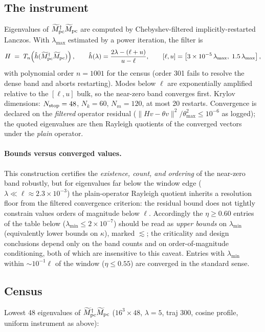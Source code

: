 \documentclass[11pt]{article}
\newcommand{\Mt}{\widetilde{M}}
\begin{document}
\subsection{The instrument}
\label{sec:instrument}
Eigenvalues of $\Mt_{\rm pc}^\dagger\Mt_{\rm pc}$ are computed by
Chebyshev-filtered implicitly-restarted Lanczos.  With
$\lambda_{\max}$ estimated by a power iteration, the filter is
\begin{equation}
H \;=\; T_{n}\!\left(\hat h(\Mt_{\rm pc}^\dagger\Mt_{\rm pc})\right),
\qquad
\hat h(\lambda) = \frac{2\lambda - (\ell + u)}{u - \ell},
\qquad
[\ell, u] = \left[3\times10^{-5}\,\lambda_{\max},\;
1.5\,\lambda_{\max}\right],
\end{equation}
with polynomial order $n = 1001$ for the census (order 301 fails to
resolve the dense band and aborts restarting).  Modes below $\ell$ are
exponentially amplified relative to the $[\ell,u]$ bulk, so the
near-zero band converges first.  Krylov dimensions:
$N_{\rm stop} = 48$, $N_k = 60$, $N_m = 120$, at most 20 restarts.
Convergence is declared on the \emph{filtered} operator residual
($\|H v - \theta v\|^2/\theta_{\max}^2 \le 10^{-6}$ as logged);
the quoted eigenvalues are then Rayleigh quotients of the converged
vectors under the \emph{plain} operator.

\paragraph{Bounds versus converged values.}
This construction certifies the \emph{existence, count, and ordering}
of the near-zero band robustly, but for eigenvalues far below the
window edge ($\lambda \ll \ell \approx 2.3\times10^{-3}$) the
plain-operator Rayleigh quotient inherits a resolution floor from the
filtered convergence criterion: the residual bound does not tightly
constrain values orders of magnitude below $\ell$.  Accordingly the
$\eta \ge 0.60$ entries of the table below ($\lambda_{\min} \le
2\times10^{-7}$) should be read as \emph{upper bounds} on
$\lambda_{\min}$ (equivalently lower bounds on $\kappa$), marked
$\lesssim$; the criticality and design conclusions depend only on the
band counts and on order-of-magnitude conditioning, both of which are
insensitive to this caveat.  Entries with $\lambda_{\min}$ within
$\sim\!10^{-1}\ell$ of the window ($\eta \le 0.55$) are converged in
the standard sense.

\subsection{Census}
Lowest 48 eigenvalues of $\Mt_{\rm pc}^\dagger \Mt_{\rm pc}$
($16^3\times 48$, $\lambda=5$, traj 300, cosine profile, uniform
instrument as above):
\end{document}
